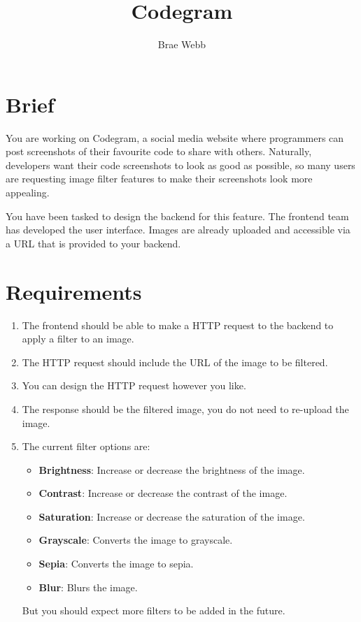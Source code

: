 \documentclass{csse4400}
\title{Codegram}
\author{Brae Webb}
\date{\week{2}}
\begin{document}
\maketitle

\section{Brief}

You are working on Codegram,
a social media website where programmers can post screenshots of their favourite code to share with others.
Naturally, developers want their code screenshots to look as good as possible,
so many users are requesting image filter features to make their screenshots look more appealing.

You have been tasked to design the backend for this feature.
The frontend team has developed the user interface.
Images are already uploaded and accessible via a URL that is provided to your backend.

\section{Requirements}

\begin{enumerate}
    \item The frontend should be able to make a HTTP request to the backend to apply a filter to an image.
    \item The HTTP request should include the URL of the image to be filtered.
    \item You can design the HTTP request however you like.
    \item The response should be the filtered image, you do not need to re-upload the image.
    \item The current filter options are:
    \begin{itemize}
        \item \textbf{Brightness}: Increase or decrease the brightness of the image.
        \item \textbf{Contrast}: Increase or decrease the contrast of the image.
        \item \textbf{Saturation}: Increase or decrease the saturation of the image.
        \item \textbf{Grayscale}: Converts the image to grayscale.
        \item \textbf{Sepia}: Converts the image to sepia.
        \item \textbf{Blur}: Blurs the image.
    \end{itemize}
        But you should expect more filters to be added in the future.
\end{enumerate}
\end{document}
